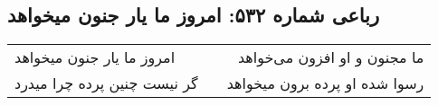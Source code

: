 \begin{center}
\section*{رباعی شماره ۵۳۲: امروز ما یار جنون میخواهد}
\label{sec:0532}
\begin{longtable}{l p{0.5cm} r}
امروز ما یار جنون میخواهد
&&
ما مجنون و او افزون می‌خواهد
\\
گر نیست چنین پرده چرا میدرد
&&
رسوا شده او پرده برون میخواهد
\\
\end{longtable}
\end{center}
